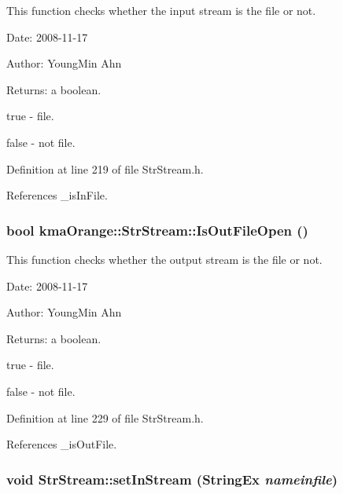 This function checks whether the input stream is the file or not. 

\begin{Desc}
\item[Date:]2008-11-17 \end{Desc}
\begin{Desc}
\item[Author:]YoungMin Ahn \end{Desc}
\begin{Desc}
\item[Returns:]a boolean.\par
 true - file.\par
 false - not file. \end{Desc}


Definition at line 219 of file StrStream.h.

References \_\-isInFile.\hypertarget{classkmaOrange_1_1StrStream_d48ff9ac58ada57fbfded35c0e50ee6e}{
\subsubsection[{IsOutFileOpen}]{\setlength{\rightskip}{0pt plus 5cm}bool kmaOrange::StrStream::IsOutFileOpen ()}}
\label{classkmaOrange_1_1StrStream_d48ff9ac58ada57fbfded35c0e50ee6e}


This function checks whether the output stream is the file or not. 

\begin{Desc}
\item[Date:]2008-11-17 \end{Desc}
\begin{Desc}
\item[Author:]YoungMin Ahn \end{Desc}
\begin{Desc}
\item[Returns:]a boolean.\par
 true - file.\par
 false - not file. \end{Desc}


Definition at line 229 of file StrStream.h.

References \_\-isOutFile.\hypertarget{classkmaOrange_1_1StrStream_2a79107f7cdaaeafa95e6da05cbea3d1}{
\subsubsection[{setInStream}]{\setlength{\rightskip}{0pt plus 5cm}void StrStream::setInStream ({\bf StringEx} {\em nameinfile})}}
\label{classkmaOrange_1_1StrStream_2a79107f7cdaaeafa95e6da05cbea3d1}


